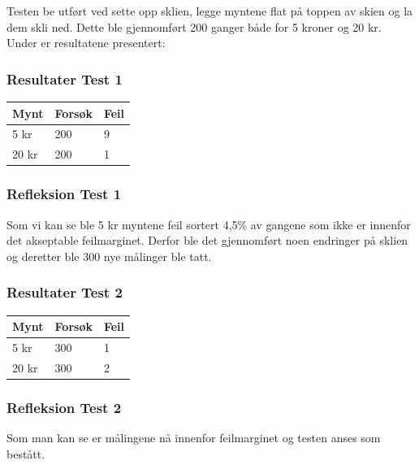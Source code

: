 \documentclass[Modultest/CoinDispenser/CoinDispenserModulTest.tex]{subfiles}
\begin{document}
Testen be utført ved sette opp sklien, legge myntene flat på toppen av skien og la dem skli ned. Dette ble gjennomført 200 ganger både for 5 kroner og 20 kr. Under er resultatene presentert:

\subsubsection{Resultater Test 1}
\begin{table}[H]
\Large
\centering
\begin{tabular}{|l|l|l|}
\hline

\textbf{Mynt} & \textbf{Forsøk} & \textbf{Feil} \\ \hline
5 kr          & 200             & 9             \\ \hline
20 kr         & 200             & 1             \\ \hline

\end{tabular}
\end{table}

\subsubsection{Refleksion Test 1}

Som vi kan se ble 5 kr myntene feil sortert 4,5\% av gangene som ikke er innenfor det akseptable feilmarginet. Derfor ble det gjennomført noen endringer på sklien og deretter ble 300 nye målinger ble tatt.

\subsubsection{Resultater Test 2}
\begin{table}[H]
\Large
\centering
\begin{tabular}{|l|l|l|}
\hline
\textbf{Mynt} & \textbf{Forsøk} & \textbf{Feil} \\ \hline
5 kr          & 300             & 1             \\ \hline
20 kr         & 300             & 2             \\ \hline
\end{tabular}
\end{table}
\subsubsection{Refleksion Test 2}
Som man kan se er målingene nå innenfor feilmarginet og testen anses som bestått.
\end{document}
